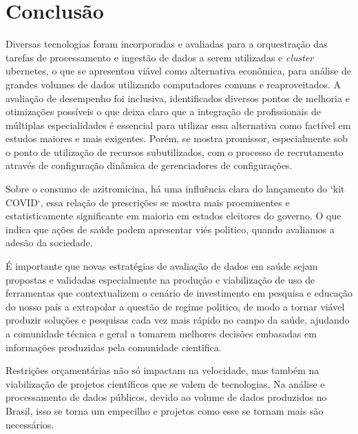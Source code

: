 
\chapter{Conclusão}
\label{chap:conclusao}

Diversas tecnologias foram incorporadas e avaliadas para a orquestração das tarefas de processamento e ingestão de dados a serem utilizadas e \emph{cluster} ubernetes, o que se apresentou viável como alternativa econômica, para análise de grandes volumes de dados utilizando computadores comuns e reaproveitados. A avaliação de desempenho foi inclusiva, identificados diversos pontos de melhoria e otimizações possíveis o que deixa claro que a integração de profissionais de múltiplas especialidades é essencial para utilizar essa alternativa como factível em estudos maiores e mais exigentes. Porém, se mostra promissor, especialmente sob o ponto de utilização de recursos subutilizados, com o processo de recrutamento através de configuração dinâmica de gerenciadores de configurações. 

Sobre o consumo de azitromicina, há uma influência clara do lançamento do ‘kit COVID‘, essa relação de prescrições se mostra mais proeminentes e estatisticamente significante em maioria em estados eleitores do governo. O que indica que ações de saúde podem apresentar viés politico, quando avaliamos a adesão da sociedade. 

É importante que novas estratégias de avaliação de dados em saúde sejam propostas e validadas especialmente na produção e viabilização de uso de ferramentas que contextualizem o cenário de investimento em pesquisa e educação do nosso país a extrapolar a questão de regime politico, de modo a tornar viável produzir soluções e pesquisas cada vez mais rápido no campo da saúde, ajudando a comunidade técnica e geral a tomarem melhores decisões embasadas em informações produzidas pela comunidade cientifica. 

Restrições orçamentárias não só impactam na velocidade, mas também na viabilização de projetos científicos que se valem de tecnologias. Na análise e processamento de dados públicos, devido ao volume de dados produzidos no Brasil, isso se torna um empecilho e projetos como esse se tornam mais são necessários.

